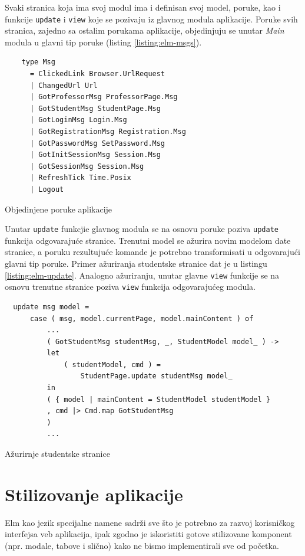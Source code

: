 \documentclass[12pt,oneside]{memoir}
\begin{document}
Svaki stranica koja ima svoj modul ima i definisan svoj model, poruke, kao i funkcije \texttt{update} i \texttt{view} koje
se pozivaju iz glavnog modula aplikacije. Poruke svih stranica, zajedno sa ostalim porukama aplikacije, objedinjuju
se unutar \emph{Main} modula u glavni tip poruke (listing \ref{listing:elm-msgs}).
\begin{listing}[h]
  \begin{verbatim}
    type Msg
      = ClickedLink Browser.UrlRequest
      | ChangedUrl Url
      | GotProfessorMsg ProfessorPage.Msg
      | GotStudentMsg StudentPage.Msg
      | GotLoginMsg Login.Msg
      | GotRegistrationMsg Registration.Msg
      | GotPasswordMsg SetPassword.Msg
      | GotInitSessionMsg Session.Msg
      | GotSessionMsg Session.Msg
      | RefreshTick Time.Posix
      | Logout
  \end{verbatim}
  \caption{Objedinjene poruke aplikacije}
  \label{listing:elm-msgs}
  \end{listing}
Unutar \texttt{update} funkcjie glavnog modula se na osnovu poruke poziva \texttt{update} funkcija 
odgovarajuće stranice. Trenutni model se ažurira novim modelom date stranice, a poruku rezultujuće komande je potrebno
transformisati u odgovarajući glavni tip poruke. Primer ažuriranja studentske stranice dat je u listingu \ref{listing:elm-update}.
Analogno ažuriranju, unutar glavne \texttt{view} funkcije se na osnovu trenutne stranice poziva \texttt{view} funkcija odgovarajućeg modula.  
\begin{listing}[h]
\begin{verbatim}
  update msg model =
      case ( msg, model.currentPage, model.mainContent ) of
          ...
          ( GotStudentMsg studentMsg, _, StudentModel model_ ) ->
          let
              ( studentModel, cmd ) =
                  StudentPage.update studentMsg model_
          in
          ( { model | mainContent = StudentModel studentModel }
          , cmd |> Cmd.map GotStudentMsg
          )
          ...
\end{verbatim}
\caption{Ažurirnje studentske stranice}
\label{listing:elm-update}
\end{listing} 


\section{Stilizovanje aplikacije}
Elm kao jezik specijalne namene sadrži sve što je potrebno za razvoj korisničkog interfejsa veb aplikacija,
ipak zgodno je iskoristiti gotove stilizovane komponent (npr. modale, tabove i slično) kako ne bismo
implementirali sve od početka.
\end{document}

